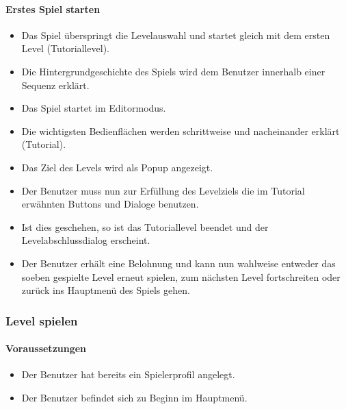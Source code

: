 \paragraph{Erstes Spiel starten}
\begin{itemize}
	\item Das Spiel überspringt die Levelauswahl und startet gleich mit dem ersten Level (Tutoriallevel).
	\item Die Hintergrundgeschichte des Spiels wird dem Benutzer innerhalb einer Sequenz erklärt.
	\item Das Spiel startet im Editormodus.
	\item Die wichtigsten Bedienflächen werden schrittweise und nacheinander erklärt (Tutorial).
	\item Das Ziel des Levels wird als Popup angezeigt.
	\item Der Benutzer muss nun zur Erfüllung des Levelziels die im Tutorial erwähnten Buttons und Dialoge benutzen.
	\item Ist dies geschehen, so ist das Tutoriallevel beendet und der Levelabschlussdialog erscheint.
	\item Der Benutzer erhält eine Belohnung und kann nun wahlweise entweder das soeben gespielte Level erneut spielen, zum nächsten Level fortschreiten oder zurück ins Hauptmenü des Spiels gehen.
\end{itemize}

\subsubsection{Level spielen}
\paragraph{Voraussetzungen}
\begin{itemize}
	\item Der Benutzer hat bereits ein Spielerprofil angelegt.
	\item Der Benutzer befindet sich zu Beginn im Hauptmenü.
\end{itemize}
